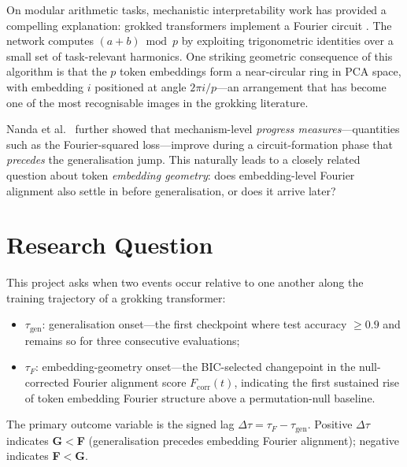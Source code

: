 \documentclass[12pt,openany,a4paper]{book}
\newcommand{\taug}{\tau_{\mathrm{gen}}}
\newcommand{\tauf}{\tau_{F}}
\newcommand{\Dtau}{\Delta\tau}
\newcommand{\fcorr}{F_{\mathrm{corr}}}
\begin{document}
On modular arithmetic tasks, mechanistic interpretability work has
provided a compelling explanation: grokked transformers implement a
Fourier circuit \cite{nanda2023progress}.
The network computes $(a+b)\bmod p$ by exploiting trigonometric
identities over a small set of task-relevant harmonics.
One striking geometric consequence of this algorithm is that the $p$ token embeddings form a near-circular ring in PCA space, with embedding $i$ positioned at angle $2\pi i/p$---an arrangement that has become one of the most recognisable images in the grokking literature.

Nanda et al.\ \cite{nanda2023progress} further showed that mechanism-level
\emph{progress measures}---quantities such as the Fourier-squared
loss---improve during a circuit-formation phase that \emph{precedes}
the generalisation jump.
This naturally leads to a closely related question about token \emph{embedding geometry}: does embedding-level Fourier alignment also settle in before generalisation, or does it arrive later?

\section{Research Question}

This project asks when two events occur relative to one another along the training trajectory of a grokking transformer:
\begin{itemize}
  \item $\taug$: generalisation onset---the first checkpoint where test
    accuracy $\geq 0.9$ and remains so for three consecutive evaluations;
  \item $\tauf$: embedding-geometry onset---the BIC-selected changepoint
    in the null-corrected Fourier alignment score $\fcorr(t)$, indicating
    the first sustained rise of token embedding Fourier structure above
    a permutation-null baseline.
\end{itemize}
The primary outcome variable is the signed lag $\Dtau = \tauf - \taug$.
Positive $\Dtau$ indicates \textbf{G$<$F} (generalisation precedes
embedding Fourier alignment); negative indicates \textbf{F$<$G}.
\end{document}
